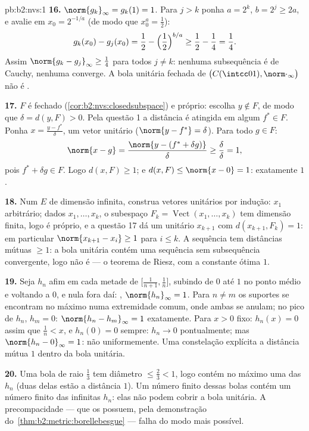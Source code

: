 \begin{solution}{pb:b2:nvs:1}
\textbf{16.} $\norm{g_k}_\infty = g_k(1) = 1$. Para $j > k$ ponha
$a = 2^k$, $b = 2^j \geq 2a$, e avalie em $x_0 = 2^{-1/a}$
(de modo que $x_0^a = \frac12$):
\[
g_k(x_0) - g_j(x_0) = \frac12 - \Bigl(\frac12\Bigr)^{b/a}
\geq \frac12 - \frac14 = \frac14 .
\]
Assim $\norm{g_k - g_j}_\infty \geq \frac14$ para todos $j \neq k$: nenhuma
subsequência é de Cauchy, nenhuma converge. A bola unitária fechada de
$\bigl(C(\intcc01), \norm\cdot_\infty\bigr)$ não é .

\textbf{17.} $F$ é fechado (\cref{cor:b2:nvs:closedsubspace})
e próprio: escolha $y \notin F$, de modo que $\delta = d(y, F) > 0$. Pela
questão 1 a distância é atingida em algum $f^* \in F$. Ponha $x
= \frac{y - f^*}{\delta}$, um vetor unitário ($\norm{y - f^*} =
\delta$). Para todo $g \in F$:
\[
\norm{x - g} = \frac{\norm{y - (f^* + \delta g)}}{\delta}
\geq \frac{\delta}{\delta} = 1 ,
\]
pois $f^* + \delta g \in F$. Logo $d(x, F) \geq 1$; e $d(x,
F) \leq \norm{x - 0} = 1$: exatamente $1$.

\textbf{18.} Num $E$ de dimensão infinita, construa vetores unitários
por indução: $x_1$ arbitrário; dados $x_1, \dots, x_k$, o
subespaço $F_k = \operatorname{Vect}(x_1, \dots, x_k)$ tem
dimensão finita, logo é próprio, e a questão 17 dá um unitário
$x_{k+1}$ com $d(x_{k+1}, F_k) = 1$: em particular
$\norm{x_{k+1} - x_i} \geq 1$ para $i \leq k$. A sequência tem
distâncias mútuas $\geq 1$: a bola unitária contém uma sequência
sem subsequência convergente, logo não é  ---
o teorema de Riesz, com a constante ótima $1$.

\textbf{19.} Seja $h_n$ afim em cada metade de
$\bigl[\frac1{n+1}, \frac1n\bigr]$, subindo de $0$ até $1$ no
ponto médio e voltando a $0$, e nula fora daí: ,
$\norm{h_n}_\infty = 1$. Para $n \neq m$ os suportes se encontram no
máximo numa extremidade comum, onde ambas se anulam; no pico de
$h_n$, $h_m = 0$: $\norm{h_n - h_m}_\infty = 1$ exatamente. Para
$x > 0$ fixo: $h_n(x) = 0$ assim que $\frac1n < x$, e
$h_n(0) = 0$ sempre: $h_n \to 0$ pontualmente; mas
$\norm{h_n - 0}_\infty = 1$: não uniformemente. Uma constelação
explícita a distância mútua $1$ dentro da bola unitária.

\textbf{20.} Uma bola de raio $\frac13$ tem diâmetro $\leq
\frac23 < 1$, logo contém no máximo uma das $h_n$ (duas delas estão
a distância $1$). Um número finito dessas bolas contém um número finito
das infinitas $h_n$: elas não podem cobrir a bola unitária.
A precompacidade --- que os  possuem, pela
demonstração do~\cref{thm:b2:metric:borellebesgue} --- falha do modo mais
 possível.


\end{solution}
